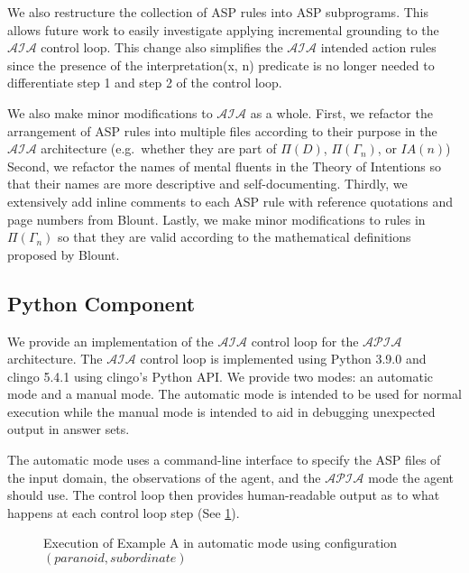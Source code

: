 We also restructure the collection of ASP rules into ASP subprograms.
This allows future work to easily investigate applying incremental grounding to the $\mathcal{AIA}$ control loop.
This change also simplifies the $\mathcal{AIA}$ intended action rules since the presence of the interpretation(x, n) predicate is no longer needed to differentiate step 1 and step 2 of the control loop.

We also make minor modifications to $\mathcal{AIA}$ as a whole.
First, we refactor the arrangement of ASP rules into multiple files according to their purpose in the $\mathcal{AIA}$ architecture (e.g.~whether they are part of $\Pi(D)$, $\Pi(\Gamma_n)$, or $IA(n)$)
Second, we refactor the names of mental fluents in the Theory of Intentions so that their names are more descriptive and self-documenting.
Thirdly, we extensively add inline comments to each ASP rule with reference quotations and page numbers from Blount.
Lastly, we make minor modifications to rules in $\Pi(\Gamma_n)$ so that they are valid according to the mathematical definitions proposed by Blount.

\subsection{Python Component}

We provide an implementation of the $\mathcal{AIA}$ control loop for the $\mathcal{APIA}$ architecture.
The $\mathcal{AIA}$ control loop is implemented using Python 3.9.0 and clingo 5.4.1 using clingo's Python API.
We provide two modes: an automatic mode and a manual mode.
The automatic mode is intended to be used for normal execution while the manual mode is intended to aid in debugging unexpected output in answer sets.

The automatic mode uses a command-line interface to specify the ASP files of the input domain, the observations of the agent, and the $\mathcal{APIA}$ mode the agent should use.
The control loop then provides human-readable output as to what happens at each control loop step (See \cref{fig:apia_example_a_execution_paraniod_subordinate}).

\begin{figure}[h]
    \centering
    
    \caption{Execution of Example A in automatic mode using configuration $(paranoid, subordinate)$}
    \label{fig:apia_example_a_execution_paraniod_subordinate}
\end{figure}

